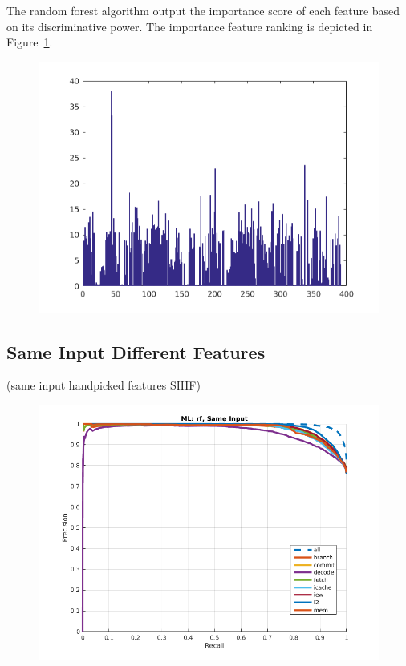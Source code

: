 \documentclass{sig-alternate}
\begin{document}
The random forest algorithm output the importance score of each feature based on its discriminative power. The importance feature ranking is depicted in Figure~\ref{fig:feat-same}.
\begin{figure}[t]
\begin{center}
   \includegraphics[width=0.95\linewidth]{./figures/feat_same.png}
\end{center}
   \caption{}
\label{fig:feat-same}
\end{figure}

\subsection{Same Input Different Features}
(same input handpicked features SIHF)

\begin{figure}[t]
\begin{center}
   \includegraphics[width=0.95\linewidth]{./figures/sidf.png}
\end{center}
   \caption{}
\label{fig:sidf}
\end{figure}
\end{document}
